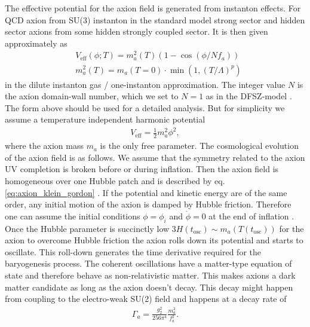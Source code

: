 \documentclass[13pt,a4paper,titlepage]{article}
\begin{document}
The effective potential for the axion field is generated from instanton effects.
For QCD axion from SU(3) instanton in the standard model strong sector and hidden sector axions from some hidden strongly coupled sector. It is then given approximately as \cite[sec. 2.2]{Axion_Cosmology_Marsh_2016}
\begin{align}
   &V_\mathrm{eff}(\phi; T) = m_a^2(T) (1 - \cos(\phi / N f_a)) \\
   &m_a^2(T) = m_a(T = 0) \cdot \min\left(1, \left( T / \Lambda \right)^p \right)
\end{align}
in the dilute instanton gas / one-instanton approximation.
The integer value $N$ is the axion domain-wall number, which we set to $N = 1$ as in the DFSZ-model \cite[sec. 2.7]{Di_Luzio_2020_Landscape_of_QCD_Axion_models}.
The form above should be used for a detailed analysis. But for simplicity we assume a temperature independent harmonic potential
\begin{align}
    V_\mathrm{eff} = \frac{1}{2} m_a^2 \phi^2,
\end{align}
where the axion mass $m_a$ is the only free parameter.
The cosmological evolution of the axion field is as follows. We assume that the
symmetry related to the axion UV completion is broken before or during inflation.
Then the axion field is homogeneous over one Hubble patch and is described by eq. \eqref{eq:axion_klein_gordon} \cite[sec. 4, eps. 4.7]{Axion_Cosmology_Marsh_2016}.
If the potential and kinetic energy are of the same order, any initial motion of the axion is damped by Hubble friction. Therefore one can assume the initial conditions $\phi = \phi_i$ and $\dot{\phi} = 0$ at the end of inflation \cite[sec. IV.A]{Axion_cosmology_Wantz_2010}.
Once the Hubble parameter is succinctly low $3 H(t_\mathrm{osc}) \sim m_a(T(t_\mathrm{osc}))$ for the axion to overcome Hubble friction the axion rolls down its potential and starts to oscillate. This roll-down generates the time derivative
required for the baryogenesis process.
The coherent oscillations have a matter-type equation of state and therefore behave as non-relativistic matter. This makes axions a dark matter candidate as long as the axion
doesn't decay.
This decay might happen from coupling to the electro-weak SU(2) field and happens at a decay rate of \cite[eq. 15]{Axion_leptogenesis_Kusenko_2015}
\begin{align}
    \Gamma_a = \frac{g_2^2}{256 \pi^4} \frac{m_a^3}{f_a^2}.
\end{align}
\end{document}
